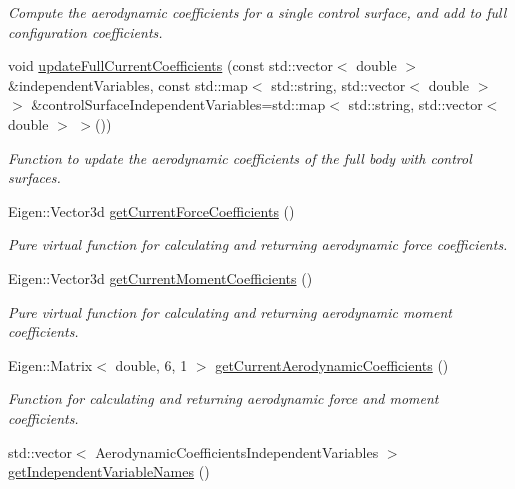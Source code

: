\begin{DoxyCompactItemize}
\begin{DoxyCompactList}\small\item\em Compute the aerodynamic coefficients for a single control surface, and add to full configuration coefficients. \end{DoxyCompactList}\item 
void \hyperlink{classtudat_1_1aerodynamics_1_1AerodynamicCoefficientInterface_ad2199d6685cd70348ce5a3886a4b1df3}{update\+Full\+Current\+Coefficients} (const std\+::vector$<$ double $>$ \&independent\+Variables, const std\+::map$<$ std\+::string, std\+::vector$<$ double $>$ $>$ \&control\+Surface\+Independent\+Variables=std\+::map$<$ std\+::string, std\+::vector$<$ double $>$ $>$())
\begin{DoxyCompactList}\small\item\em Function to update the aerodynamic coefficients of the full body with control surfaces. \end{DoxyCompactList}\item 
Eigen\+::\+Vector3d \hyperlink{classtudat_1_1aerodynamics_1_1AerodynamicCoefficientInterface_a1d482f3c4cba5a2354d12610319aa7af}{get\+Current\+Force\+Coefficients} ()
\begin{DoxyCompactList}\small\item\em Pure virtual function for calculating and returning aerodynamic force coefficients. \end{DoxyCompactList}\item 
Eigen\+::\+Vector3d \hyperlink{classtudat_1_1aerodynamics_1_1AerodynamicCoefficientInterface_a81b6c6f36bea4e10bdde1d67f95740d7}{get\+Current\+Moment\+Coefficients} ()
\begin{DoxyCompactList}\small\item\em Pure virtual function for calculating and returning aerodynamic moment coefficients. \end{DoxyCompactList}\item 
Eigen\+::\+Matrix$<$ double, 6, 1 $>$ \hyperlink{classtudat_1_1aerodynamics_1_1AerodynamicCoefficientInterface_a954fde716c0874476c73130b5941036f}{get\+Current\+Aerodynamic\+Coefficients} ()
\begin{DoxyCompactList}\small\item\em Function for calculating and returning aerodynamic force and moment coefficients. \end{DoxyCompactList}\item 
std\+::vector$<$ Aerodynamic\+Coefficients\+Independent\+Variables $>$ \hyperlink{classtudat_1_1aerodynamics_1_1AerodynamicCoefficientInterface_a605d78a84519402354ac1551e7eb2d0d}{get\+Independent\+Variable\+Names} ()

\end{DoxyCompactItemize}
